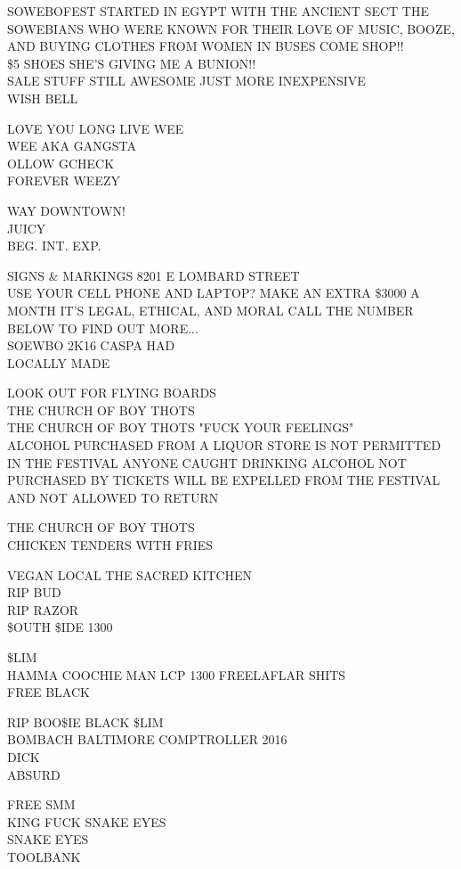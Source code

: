 \documentclass[10pt,letterpaper]{article}
\begin{document}
SOWEBOFEST STARTED IN EGYPT WITH THE ANCIENT SECT THE SOWEBIANS WHO WERE KNOWN FOR THEIR LOVE OF MUSIC, BOOZE, AND BUYING CLOTHES FROM WOMEN IN BUSES COME SHOP!!\\
\$5 SHOES SHE'S GIVING ME A BUNION!!\\
SALE STUFF STILL AWESOME JUST MORE INEXPENSIVE\\
WISH BELL

LOVE YOU LONG LIVE WEE\\
WEE AKA GANGSTA\\
OLLOW GCHECK\\
FOREVER WEEZY

WAY DOWNTOWN!\\
JUICY\\
BEG. INT. EXP.

SIGNS \& MARKINGS 8201 E LOMBARD STREET\\
USE YOUR CELL PHONE AND LAPTOP?  MAKE AN EXTRA \$3000 A MONTH IT'S LEGAL, ETHICAL, AND MORAL CALL THE NUMBER BELOW TO FIND OUT MORE...\\
SOEWBO 2K16 CASPA HAD\\
LOCALLY MADE

LOOK OUT FOR FLYING BOARDS\\
THE CHURCH OF BOY THOTS\\
THE CHURCH OF BOY THOTS "FUCK YOUR FEELINGS"\\
ALCOHOL PURCHASED FROM A LIQUOR STORE IS NOT PERMITTED IN THE FESTIVAL ANYONE CAUGHT DRINKING ALCOHOL NOT PURCHASED BY TICKETS WILL BE EXPELLED FROM THE FESTIVAL AND NOT ALLOWED TO RETURN

THE CHURCH OF BOY THOTS\\
CHICKEN TENDERS WITH FRIES

VEGAN LOCAL THE SACRED KITCHEN\\
RIP BUD\\
RIP RAZOR\\
\$OUTH \$IDE 1300

\$LIM\\
HAMMA COOCHIE MAN LCP 1300 FREELAFLAR SHITS\\
FREE BLACK

RIP BOO\$IE BLACK \$LIM\\
BOMBACH BALTIMORE COMPTROLLER 2016\\
DICK\\
ABSURD

FREE SMM\\
KING FUCK SNAKE EYES\\
SNAKE EYES\\
TOOLBANK
\end{document}
